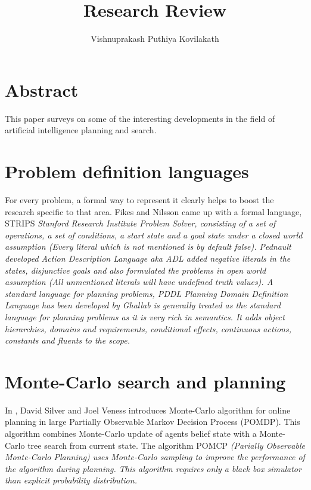\documentclass[12pt]{article}
\title{Research Review}
\author{Vishnuprakash Puthiya Kovilakath}
\begin{document}
\maketitle

\section{Abstract}
This paper surveys on some of the interesting developments in the field of artificial intelligence planning and search.

\section{Problem definition languages}
For every problem, a formal way to represent it clearly helps to boost the research specific to that area. Fikes and Nilsson came up with a formal language, STRIPS \cite{Fikes71} \em{Stanford  Research Institute Problem Solver}\em,  consisting of a set of operations, a set of conditions,  a start state and a goal state under a closed world assumption (Every literal which is not mentioned is by default false). Pednault developed \em Action Description Language \em \cite{Pednault89b} aka ADL added negative literals in the states, disjunctive goals and also formulated the problems in open world assumption (All unmentioned literals will have undefined truth values). A standard language for planning problems, PDDL \em Planning Domain Definition Language \em \cite{Ghallab98} has been developed by Ghallab is generally treated as the standard language for planning problems as it is very rich in semantics. It adds object hierarchies,  domains and requirements, conditional effects, continuous actions, constants and fluents to the scope.

\section{Monte-Carlo search and planning}

In \cite{Silver10}, David Silver and Joel Veness introduces  Monte-Carlo algorithm for online planning in large Partially Observable Markov Decision Process (POMDP). This algorithm combines Monte-Carlo update of agents belief state with a Monte-Carlo tree search from current state. The algorithm POMCP \em (Parially Observable Monte-Carlo Planning) \em uses Monte-Carlo sampling  to improve the performance of the algorithm during planning.  This algorithm requires only a black box simulator than explicit probability distribution.   
\end{document}
